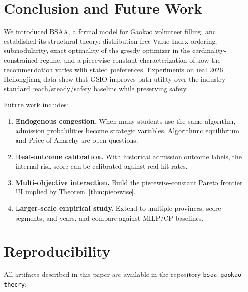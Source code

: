 \documentclass[11pt,a4paper]{article}
\begin{document}
\section{Conclusion and Future Work}\label{sec:conclusion}

We introduced BSAA, a formal model for Gaokao volunteer filling, and established its structural theory: distribution-free Value-Index ordering, submodularity, exact optimality of the greedy optimizer in the cardinality-constrained regime, and a piecewise-constant characterization of how the recommendation varies with stated preferences. Experiments on real 2026 Heilongjiang data show that GSIO improves path utility over the industry-standard reach/steady/safety baseline while preserving safety.

Future work includes:
\begin{enumerate}
  \item \textbf{Endogenous congestion.} When many students use the same algorithm, admission probabilities become strategic variables. Algorithmic equilibrium and Price-of-Anarchy are open questions.
  \item \textbf{Real-outcome calibration.} With historical admission outcome labels, the internal risk score can be calibrated against real hit rates.
  \item \textbf{Multi-objective interaction.} Build the piecewise-constant Pareto frontier UI implied by Theorem~\ref{thm:piecewise}.
  \item \textbf{Larger-scale empirical study.} Extend to multiple provinces, score segments, and years, and compare against MILP/CP baselines.
\end{enumerate}



\appendix
\section{Reproducibility}

All artifacts described in this paper are available in the repository \texttt{bsaa-gaokao-theory}:
\end{document}
